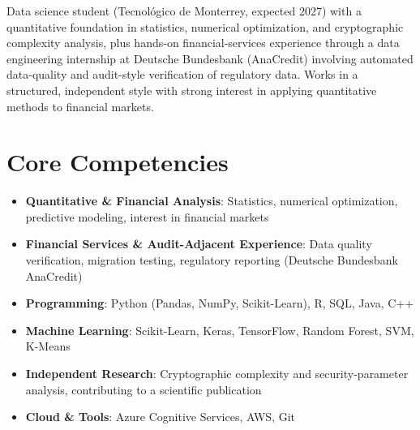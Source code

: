 \documentclass[11pt,a4paper,sans]{moderncv}
\begin{document}
\makecvtitle


\vspace{6pt}
\small{Data science student (Tecnológico de Monterrey, expected 2027) with a quantitative foundation in statistics, numerical optimization, and cryptographic complexity analysis, plus hands-on financial-services experience through a data engineering internship at Deutsche Bundesbank (AnaCredit) involving automated data-quality and audit-style verification of regulatory data. Works in a structured, independent style with strong interest in applying quantitative methods to financial markets.}


\section{Core Competencies}
\vspace{1pt}
\begin{itemize}

\item \textbf{Quantitative \& Financial Analysis}: Statistics, numerical optimization, predictive modeling, interest in financial markets

\item \textbf{Financial Services \& Audit-Adjacent Experience}: Data quality verification, migration testing, regulatory reporting (Deutsche Bundesbank AnaCredit)

\item \textbf{Programming}: Python (Pandas, NumPy, Scikit-Learn), R, SQL, Java, C++

\item \textbf{Machine Learning}: Scikit-Learn, Keras, TensorFlow, Random Forest, SVM, K-Means

\item \textbf{Independent Research}: Cryptographic complexity and security-parameter analysis, contributing to a scientific publication

\item \textbf{Cloud \& Tools}: Azure Cognitive Services, AWS, Git

\end{itemize}
\end{document}
